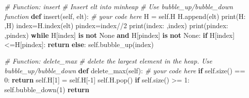 \documentclass[
]{article}
\newenvironment{Shaded}{}{}
\newcommand{\BuiltInTok}[1]{\textcolor[rgb]{0.00,0.50,0.00}{#1}}
\newcommand{\CommentTok}[1]{\textcolor[rgb]{0.38,0.63,0.69}{\textit{#1}}}
\newcommand{\ControlFlowTok}[1]{\textcolor[rgb]{0.00,0.44,0.13}{\textbf{#1}}}
\newcommand{\DecValTok}[1]{\textcolor[rgb]{0.25,0.63,0.44}{#1}}
\newcommand{\KeywordTok}[1]{\textcolor[rgb]{0.00,0.44,0.13}{\textbf{#1}}}
\newcommand{\NormalTok}[1]{#1}
\newcommand{\OperatorTok}[1]{\textcolor[rgb]{0.40,0.40,0.40}{#1}}
\newcommand{\StringTok}[1]{\textcolor[rgb]{0.25,0.44,0.63}{#1}}
\newcommand{\VariableTok}[1]{\textcolor[rgb]{0.10,0.09,0.49}{#1}}
\begin{document}
\begin{Shaded}
\begin{Highlighting}[]
    \CommentTok{\# Function: insert}
    \CommentTok{\# Insert elt into minheap}
    \CommentTok{\# Use bubble\_up/bubble\_down function}
    \KeywordTok{def}\NormalTok{ insert(}\VariableTok{self}\NormalTok{, elt):}
        \CommentTok{\# your code here}
\NormalTok{        H }\OperatorTok{=} \VariableTok{self}\NormalTok{.H}
\NormalTok{        H.append(elt)}
        \BuiltInTok{print}\NormalTok{(}\StringTok{\textquotesingle{}H: \textquotesingle{}}\NormalTok{,H)}
\NormalTok{        index}\OperatorTok{=}\NormalTok{H.index(elt)}
\NormalTok{        pindex}\OperatorTok{=}\NormalTok{index}\OperatorTok{//}\DecValTok{2}
        \BuiltInTok{print}\NormalTok{(}\StringTok{\textquotesingle{}index: \textquotesingle{}}\NormalTok{,index)}
        \BuiltInTok{print}\NormalTok{(}\StringTok{\textquotesingle{}pindex: \textquotesingle{}}\NormalTok{,pindex)}
        \ControlFlowTok{while}\NormalTok{ H[index] }\KeywordTok{is} \KeywordTok{not} \VariableTok{None} \KeywordTok{and}\NormalTok{ H[pindex] }\KeywordTok{is} \KeywordTok{not} \VariableTok{None}\NormalTok{:}
          \ControlFlowTok{if}\NormalTok{ H[index]}\OperatorTok{\textless{}=}\NormalTok{H[pindex]:}
              \ControlFlowTok{return}
          \ControlFlowTok{else}\NormalTok{:}
              \VariableTok{self}\NormalTok{.bubble\_up(index)}


    \CommentTok{\# Function: delete\_max}
    \CommentTok{\# delete the largest element in the heap. Use bubble\_up/bubble\_down}
    \KeywordTok{def}\NormalTok{ delete\_max(}\VariableTok{self}\NormalTok{):}
        \CommentTok{\# your code here}
        \ControlFlowTok{if} \VariableTok{self}\NormalTok{.size() }\OperatorTok{==} \DecValTok{0}\NormalTok{:}
          \ControlFlowTok{return}
        \VariableTok{self}\NormalTok{.H[}\DecValTok{1}\NormalTok{] }\OperatorTok{=} \VariableTok{self}\NormalTok{.H[}\OperatorTok{{-}}\DecValTok{1}\NormalTok{]}
        \VariableTok{self}\NormalTok{.H.pop()}
        \ControlFlowTok{if} \VariableTok{self}\NormalTok{.size() }\OperatorTok{\textgreater{}=} \DecValTok{1}\NormalTok{:}
          \VariableTok{self}\NormalTok{.bubble\_down(}\DecValTok{1}\NormalTok{)}
        \ControlFlowTok{return}
\end{Highlighting}
\end{Shaded}
\end{document}
